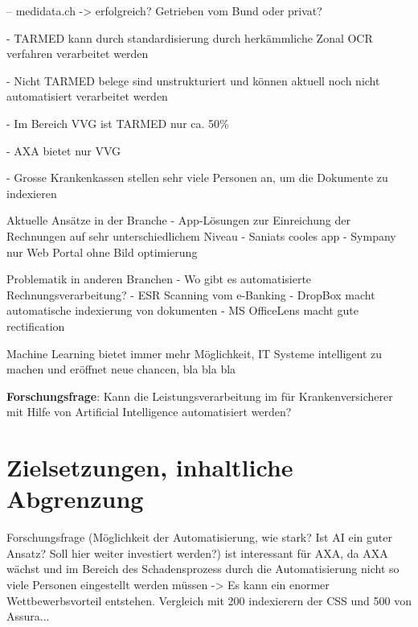 \documentclass{article}
\begin{document}
  -- medidata.ch -> erfolgreich? Getrieben vom Bund oder privat?

- TARMED kann durch standardisierung durch herkämmliche Zonal OCR verfahren verarbeitet werden

- Nicht TARMED belege sind unstrukturiert und können aktuell noch nicht automatisiert verarbeitet werden

- Im Bereich VVG ist TARMED nur ca. 50\%

- AXA bietet nur VVG

- Grosse Krankenkassen stellen sehr viele Personen an, um die Dokumente zu indexieren

Aktuelle Ansätze in der Branche
- App-Lösungen zur Einreichung der Rechnungen auf sehr unterschiedlichem Niveau
  - Saniats cooles app
  - Sympany nur Web Portal ohne Bild optimierung

Problematik in anderen Branchen
- Wo gibt es automatisierte Rechnungsverarbeitung?
- ESR Scanning vom e-Banking
- DropBox macht automatische indexierung von dokumenten
- MS OfficeLens macht gute rectification

Machine Learning bietet immer mehr Möglichkeit, IT Systeme intelligent zu machen und eröffnet neue chancen, bla bla bla

\textbf{Forschungsfrage}: Kann die Leistungsverarbeitung im für Krankenversicherer mit Hilfe von Artificial Intelligence automatisiert werden?

\section{Zielsetzungen, inhaltliche Abgrenzung}


Forschungsfrage (Möglichkeit der Automatisierung, wie stark? Ist AI ein guter Ansatz? Soll hier weiter investiert werden?) ist interessant für AXA, da AXA wächst und im Bereich des Schadensprozess durch die Automatisierung nicht so viele Personen eingestellt werden müssen -> Es kann ein enormer Wettbewerbsvorteil entstehen. Vergleich mit 200 indexierern der CSS und 500 von Assura...
\end{document}
